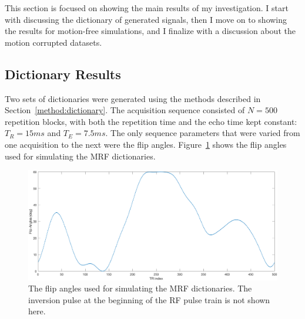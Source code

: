 
This section is focused on showing the main results of my investigation.
I start with discussing the dictionary of generated signals, 
then I move on to showing the results for motion-free simulations,
and I finalize with a discussion about the motion corrupted datasets.

\subsection{Dictionary Results}

Two sets of dictionaries were generated using the methods described in Section~\ref{method:dictionary}.
The acquisition sequence consisted of $N = 500$ repetition blocks, with both the repetition time and the echo time kept constant: $T_R = 15ms$ and $T_E = 7.5ms$.
The only sequence parameters that were varied from one acquisition to the next were the flip angles.
Figure~\ref{fig:FAsMaryia} shows the flip angles used for simulating the MRF dictionaries. 

\begin{figure}[ht]
    \centering
    \includegraphics[width=1\textwidth]{images/mrf/FAsMaryia}
    \caption{The flip angles used for simulating the MRF dictionaries.
    The inversion pulse at the beginning of the RF pulse train is not shown here.}
    \label{fig:FAsMaryia}
\end{figure}

